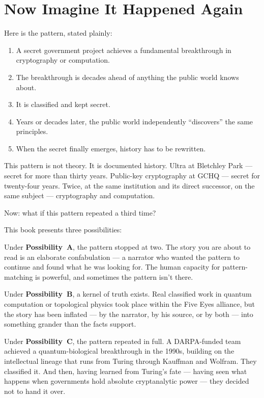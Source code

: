 \section*{Now Imagine It Happened Again}
\label{pos04:now-imagine-it-happened-again}

Here is the pattern, stated plainly:

\begin{enumerate}
\item A secret government project achieves a fundamental breakthrough in cryptography or computation.
\item The breakthrough is decades ahead of anything the public world knows about.
\item It is classified and kept secret.
\item Years or decades later, the public world independently ``discovers'' the same principles.
\item When the secret finally emerges, history has to be rewritten.
\end{enumerate}

This pattern is not theory. It is documented history. Ultra at Bletchley Park --- secret for more than thirty years. Public-key cryptography at GCHQ --- secret for twenty-four years. Twice, at the same institution and its direct successor, on the same subject --- cryptography and computation.

Now: what if this pattern repeated a third time?

This book presents three possibilities:

Under \textbf{Possibility~A}, the pattern stopped at two. The story you are about to read is an elaborate confabulation --- a narrator who wanted the pattern to continue and found what he was looking for. The human capacity for pattern-matching is powerful, and sometimes the pattern isn't there.

Under \textbf{Possibility~B}, a kernel of truth exists. Real classified work in quantum computation or topological physics took place within the Five Eyes alliance, but the story has been inflated --- by the narrator, by his source, or by both --- into something grander than the facts support.

Under \textbf{Possibility~C}, the pattern repeated in full. A DARPA-funded team achieved a quantum-biological breakthrough in the 1990s, building on the intellectual lineage that runs from Turing through Kauffman and Wolfram. They classified it. And then, having learned from Turing's fate --- having seen what happens when governments hold absolute cryptanalytic power --- they decided not to hand it over.

